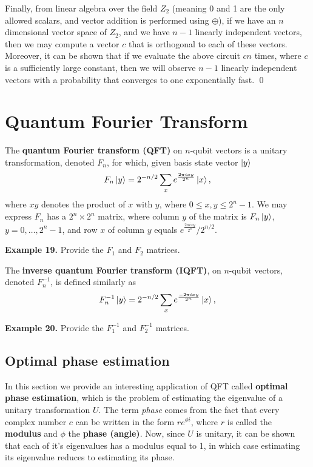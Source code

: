 \documentclass [12pt]{article}
\theoremstyle{definition}
\begin{document}
Finally, from linear algebra over the field $Z_2$ (meaning 0 and 1 are the only allowed scalars, and vector addition is performed using $\oplus$),  if we have an $n$ dimensional
vector space of $Z_2$, and we have  $n-1$ linearly independent vectors, then we may compute a vector $c$ that is orthogonal to each of these vectors. Moreover, it can 
be shown that if we 
evaluate the above circuit $cn$ times, where $c$ is a sufficiently large constant, then we will observe $n-1$ linearly independent vectors with a probability that converges
to one exponentially fast.  \qed

\section*{Quantum Fourier Transform}

The \textbf{quantum Fourier transform (QFT)} on $n$-qubit vectors is a unitary transformation, denoted $F_n$,  for which, given basis state vector $\ket{y}$
\[F_n\ket{y} = 2^{-n/2}\sum_{x} e^{\frac{2\pi ixy}{2^n}}\ket{x},\]
where $xy$ denotes the product of $x$ with $y$, where $0\leq x,y\leq 2^{n}-1$.
We may express $F_n$ has a $2^n\times 2^n$ matrix, where column $y$ of the matrix is $F_n\ket{y}$, $y=0,\ldots,2^{n}-1$, and row $x$ of column $y$ equals
$e^{\frac{2\pi ixy}{2^n}}/2^{n/2}$.


\textbf{Example 19.} Provide the $F_1$ and $F_2$ matrices.


\newpage
The \textbf{inverse quantum Fourier transform (IQFT)}, on $n$-qubit vectors, denoted $F_n^{-1}$, is defined similarly as
\[F_n^{-1}\ket{y} = 2^{-n/2}\sum_{x} e^{\frac{-2\pi ixy}{2^n}}\ket{x},\]

\textbf{Example 20.} Provide the $F_1^{-1}$ and $F_2^{-1}$ matrices.

\newpage
\subsection*{Optimal phase estimation}

In this section we provide an interesting application of QFT called \textbf{optimal phase estimation}, which is the problem of estimating the eigenvalue of a
unitary transformation $U$. The term \textit{phase} comes from the fact that every complex number $c$ can be written in the form $re^{\phi i}$, where $r$ is called the \textbf{modulus}
and $\phi$ the \textbf{phase (angle)}. Now, since $U$ is unitary, it can be shown that each of it's eigenvalues has a modulus equal to 1, in which case estimating its eigenvalue
reduces to estimating its phase. 
\end{document}
